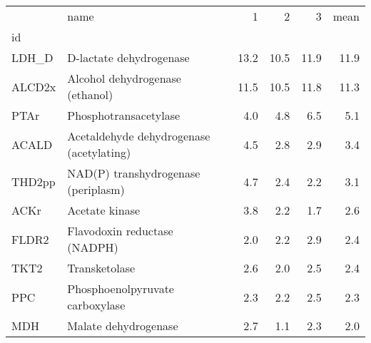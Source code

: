 \begin{tabular}{llrrrr}
\toprule
{} &                                      name &    1 &    2 &    3 &  mean \\
id     &                                           &      &      &      &       \\
\midrule
LDH\_D  &  D-lactate dehydrogenase & 13.2 & 10.5 & 11.9 & 11.9 \\
ALCD2x &  Alcohol dehydrogenase (ethanol) & 11.5 & 10.5 & 11.8 & 11.3 \\
PTAr   &  Phosphotransacetylase & 4.0 & 4.8 & 6.5 & 5.1 \\
ACALD  &  Acetaldehyde dehydrogenase (acetylating) & 4.5 & 2.8 & 2.9 & 3.4 \\
THD2pp &  NAD(P) transhydrogenase (periplasm) & 4.7 & 2.4 & 2.2 & 3.1 \\
ACKr   &  Acetate kinase & 3.8 & 2.2 & 1.7 & 2.6 \\
FLDR2  &  Flavodoxin reductase (NADPH) & 2.0 & 2.2 & 2.9 & 2.4 \\
TKT2   &  Transketolase & 2.6 & 2.0 & 2.5 & 2.4 \\
PPC    &  Phosphoenolpyruvate carboxylase & 2.3 & 2.2 & 2.5 & 2.3 \\
MDH    &  Malate dehydrogenase & 2.7 & 1.1 & 2.3 & 2.0 \\
\bottomrule
\end{tabular}
